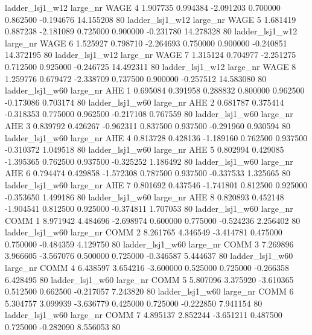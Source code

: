     ladder_lsj1_w12   large_nr     WAGE                 4  1.907735  0.994384  -2.091203 0.700000 0.862500 -0.194676   14.155208 80
    ladder_lsj1_w12   large_nr     WAGE                 5  1.681419  0.887238  -2.181089 0.725000 0.900000 -0.231780   14.278328 80
    ladder_lsj1_w12   large_nr     WAGE                 6  1.525927  0.798710  -2.264693 0.750000 0.900000 -0.240851   14.372195 80
    ladder_lsj1_w12   large_nr     WAGE                 7  1.315124  0.704977  -2.251275 0.712500 0.925000 -0.246725   14.492311 80
    ladder_lsj1_w12   large_nr     WAGE                 8  1.259776  0.679472  -2.338709 0.737500 0.900000 -0.257512   14.583080 80
    ladder_lsj1_w60   large_nr      AHE                 1  0.695084  0.391958   0.288832 0.800000 0.962500 -0.173086    0.703174 80
    ladder_lsj1_w60   large_nr      AHE                 2  0.681787  0.375414  -0.318353 0.775000 0.962500 -0.217108    0.767559 80
    ladder_lsj1_w60   large_nr      AHE                 3  0.839792  0.426267  -0.962311 0.837500 0.937500 -0.291960    0.930594 80
    ladder_lsj1_w60   large_nr      AHE                 4  0.813728  0.428136  -1.189160 0.762500 0.937500 -0.310372    1.049518 80
    ladder_lsj1_w60   large_nr      AHE                 5  0.802994  0.429085  -1.395365 0.762500 0.937500 -0.325252    1.186492 80
    ladder_lsj1_w60   large_nr      AHE                 6  0.794474  0.429858  -1.572308 0.787500 0.937500 -0.337533    1.325665 80
    ladder_lsj1_w60   large_nr      AHE                 7  0.801692  0.437546  -1.741801 0.812500 0.925000 -0.353650    1.499186 80
    ladder_lsj1_w60   large_nr      AHE                 8  0.820893  0.452148  -1.904541 0.812500 0.925000 -0.374811    1.707053 80
    ladder_lsj1_w60   large_nr     COMM                 1  8.971942  4.484696  -2.698974 0.600000 0.775000 -0.524236    2.256402 80
    ladder_lsj1_w60   large_nr     COMM                 2  8.261765  4.346549  -3.414781 0.475000 0.750000 -0.484359    4.129750 80
    ladder_lsj1_w60   large_nr     COMM                 3  7.269896  3.966605  -3.567076 0.500000 0.725000 -0.346587    5.444637 80
    ladder_lsj1_w60   large_nr     COMM                 4  6.438597  3.654216  -3.600000 0.525000 0.725000 -0.266358    6.428495 80
    ladder_lsj1_w60   large_nr     COMM                 5  5.807096  3.375920  -3.610365 0.512500 0.662500 -0.217057    7.243820 80
    ladder_lsj1_w60   large_nr     COMM                 6  5.304757  3.099939  -3.636779 0.425000 0.725000 -0.222850    7.941154 80
    ladder_lsj1_w60   large_nr     COMM                 7  4.895137  2.852244  -3.651211 0.487500 0.725000 -0.282090    8.556053 80
